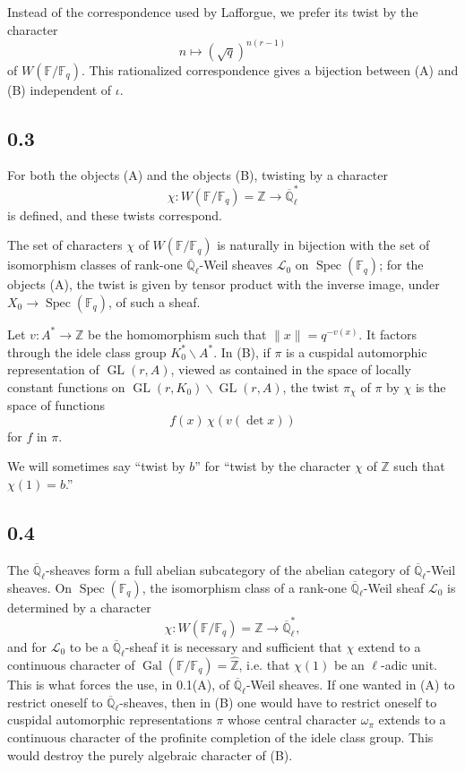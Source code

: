\documentclass[11pt]{article}
\newcommand{\F}{\mathbb{F}}
\newcommand{\Z}{\mathbb{Z}}
\newcommand{\Ql}{\overline{\mathbb Q}_{\ell}}
\newcommand{\Spec}{\operatorname{Spec}}
\newcommand{\Gal}{\operatorname{Gal}}
\newcommand{\GL}{\operatorname{GL}}
\begin{document}
Instead of the correspondence used by Lafforgue, we prefer its twist by the character
\[
 n\longmapsto (\sqrt q)^{n(r-1)}
\]
of $W(\F/\F_q)$.
This rationalized correspondence gives a bijection between (A) and (B) independent of $\iota$.

\subsection*{0.3}
For both the objects (A) and the objects (B), twisting by a character
\[
 \chi:W(\F/\F_q)=\Z\longrightarrow \Ql^*
\]
is defined, and these twists correspond.

The set of characters $\chi$ of $W(\F/\F_q)$ is naturally in bijection with the set of isomorphism classes of rank-one $\Ql$-Weil sheaves $\mathcal L_0$ on $\Spec(\F_q)$; for the objects (A), the twist is given by tensor product with the inverse image, under $X_0\to\Spec(\F_q)$, of such a sheaf.

Let $v:A^*\to\Z$ be the homomorphism such that $\|x\|=q^{-v(x)}$.
It factors through the idele class group $K_0^*\backslash A^*$.
In (B), if $\pi$ is a cuspidal automorphic representation of $\GL(r,A)$, viewed as contained in the space of locally constant functions on $\GL(r,K_0)\backslash\GL(r,A)$, the twist $\pi_\chi$ of $\pi$ by $\chi$ is the space of functions
\[
 f(x)\,\chi(v(\det x))
\]
for $f$ in $\pi$.

We will sometimes say ``twist by $b$'' for ``twist by the character $\chi$ of $\Z$ such that $\chi(1)=b$.''

\subsection*{0.4}
The $\Ql$-sheaves form a full abelian subcategory of the abelian category of $\Ql$-Weil sheaves.
On $\Spec(\F_q)$, the isomorphism class of a rank-one $\Ql$-Weil sheaf $\mathcal L_0$ is determined by a character
\[
 \chi:W(\F/\F_q)=\Z\longrightarrow \Ql^* ,
\]
and for $\mathcal L_0$ to be a $\Ql$-sheaf it is necessary and sufficient that $\chi$ extend to a continuous character of $\Gal(\F/\F_q)=\widehat{\Z}$, i.e. that $\chi(1)$ be an $\ell$-adic unit.
This is what forces the use, in 0.1(A), of $\Ql$-Weil sheaves.
If one wanted in (A) to restrict oneself to $\Ql$-sheaves, then in (B) one would have to restrict oneself to cuspidal automorphic representations $\pi$ whose central character $\omega_\pi$ extends to a continuous character of the profinite completion of the idele class group.
This would destroy the purely algebraic character of (B).
\end{document}

